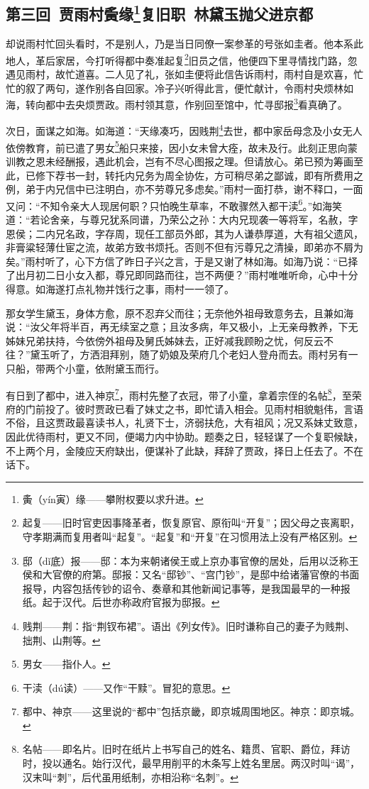 \subsection*{第三回\ 贾雨村夤缘\footnote{夤（yín寅）缘——攀附权要以求升进。}复旧职\ 林黛玉抛父进京都}
\par 却说雨村忙回头看时，不是别人，乃是当日同僚一案参革的号张如圭者。他本系此地人，革后家居，今打听得都中奏准起复\footnote{起复——旧时官吏因事降革者，恢复原官、原衔叫“开复”；因父母之丧离职，守孝期满而复用者叫“起复”。“起复”和“开复”在习惯用法上没有严格区别。}旧员之信，他便四下里寻情找门路，忽遇见雨村，故忙道喜。二人见了礼，张如圭便将此信告诉雨村，雨村自是欢喜，忙忙的叙了两句，遂作别各自回家。冷子兴听得此言，便忙献计，令雨村央烦林如海，转向都中去央烦贾政。雨村领其意，作别回至馆中，忙寻邸报\footnote{邸（dǐ底）报——邸：本为来朝诸侯王或上京办事官僚的居处，后用以泛称王侯和大官僚的府第。邸报：又名“邸钞”、“宫门钞”，是邸中给诸藩官僚的书面报导，内容包括传钞的诏令、奏章和其他新闻记事等，是我国最早的一种报纸。起于汉代。后世亦称政府官报为邸报。}看真确了。
\par 次日，面谋之如海。如海道：“天缘凑巧，因贱荆\footnote{贱荆——荆：指“荆钗布裙”。语出《列女传》。旧时谦称自己的妻子为贱荆、拙荆、山荆等。}去世，都中家岳母念及小女无人依傍教育，前已遣了男女\footnote{男女——指仆人。}船只来接，因小女未曾大痊，故未及行。此刻正思向蒙训教之恩未经酬报，遇此机会，岂有不尽心图报之理。但请放心。弟已预为筹画至此，已修下荐书一封，转托内兄务为周全协佐，方可稍尽弟之鄙诚，即有所费用之例，弟于内兄信中已注明白，亦不劳尊兄多虑矣。”雨村一面打恭，谢不释口，一面又问：“不知令亲大人现居何职？只怕晚生草率，不敢骤然入都干渎\footnote{干渎（dú读）——又作“干黩”。冒犯的意思。}。”如海笑道：“若论舍亲，与尊兄犹系同谱，乃荣公之孙：大内兄现袭一等将军，名赦，字恩侯；二内兄名政，字存周，现任工部员外郎，其为人谦恭厚道，大有祖父遗风，非膏粱轻薄仕宦之流，故弟方致书烦托。否则不但有污尊兄之清操，即弟亦不屑为矣。”雨村听了，心下方信了昨日子兴之言，于是又谢了林如海。如海乃说：“已择了出月初二日小女入都，尊兄即同路而往，岂不两便？”雨村唯唯听命，心中十分得意。如海遂打点礼物并饯行之事，雨村一一领了。
\par 那女学生黛玉，身体方愈，原不忍弃父而往；无奈他外祖母致意务去，且兼如海说：“汝父年将半百，再无续室之意；且汝多病，年又极小，上无亲母教养，下无姊妹兄弟扶持，今依傍外祖母及舅氏姊妹去，正好减我顾盼之忧，何反云不往？”黛玉听了，方洒泪拜别，随了奶娘及荣府几个老妇人登舟而去。雨村另有一只船，带两个小童，依附黛玉而行。
\par 有日到了都中，进入神京\footnote{都中、神京——这里说的“都中”包括京畿，即京城周围地区。神京：即京城。}，雨村先整了衣冠，带了小童，拿着宗侄的名帖\footnote{名帖——即名片。旧时在纸片上书写自己的姓名、籍贯、官职、爵位，拜访时，投以通名。始行汉代，最早用削平的木条写上姓名里居。两汉时叫“谒”，汉末叫“刺”，后代虽用纸制，亦相沿称“名刺”。}，至荣府的门前投了。彼时贾政已看了妹丈之书，即忙请入相会。见雨村相貌魁伟，言语不俗，且这贾政最喜读书人，礼贤下士，济弱扶危，大有祖风；况又系妹丈致意，因此优待雨村，更又不同，便竭力内中协助。题奏之日，轻轻谋了一个复职候缺，不上两个月，金陵应天府缺出，便谋补了此缺，拜辞了贾政，择日上任去了。不在话下。
